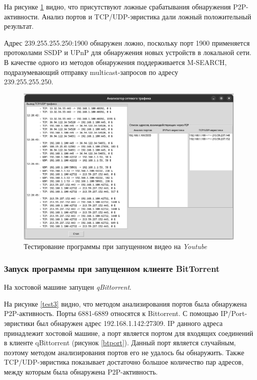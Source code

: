 \documentclass[bachelor, och, coursework]{SCWorks}
\begin{document}
На рисунке \ref{test2} видно, что присутствуют ложные срабатывания обнаружения P2P-активности. Анализ портов и TCP/UDP-эвристика дали ложный положительный результат.

Адрес 239.255.255.250:1900 обнаружен ложно, поскольку порт 1900 применяется протоколами SSDP и UPnP для обнаружения новых устройств в локальной сети. В качестве одного из методов обнаружения поддерживается M-SEARCH, подразумевающий отправку multicast-запросов по адресу \\ 239.255.255.250. \cite{IANA}

\begin{figure}[H]
    \centering
    \includegraphics[width=0.999\textwidth]{test2.png}
    \caption{Тестирование программы при запущенном видео на \textit{Youtube}}
    \label{test2}
\end{figure}

\subsubsection{Запуск программы при запущенном клиенте BitTorrent}
На хостовой машине запущен \textit{qBittorrent}. 

На рисунке \ref{test3} видно, что методом анализирования портов была обнаружена P2P-активность. Порты 6881-6889 относятся к Bittorrent. С помощью IP/Port-эвристики был обнаружен адрес 192.168.1.142:27309. IP данного адреса принадлежит хостовой машине, а порт является портом для входящих соединений в клиенте qBittorrent (рисунок \ref{btport}). Данный порт является случайным, поэтому методом анализирования портов его не удалось бы обнаружить. Также TCP/UDP-эвристика показывает достаточно большое количество пар адресов, между которым была обнаружена P2P-активность.
\end{document}
